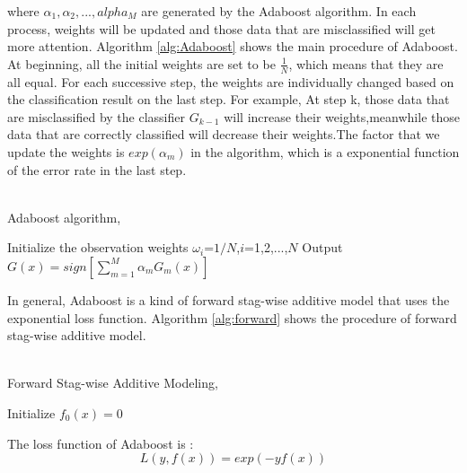 where $\alpha_1,\alpha_2,...,alpha_M$ are generated by the Adaboost algorithm. In each process, weights will be updated and those data that are misclassified will get more attention. Algorithm \ref{alg:Adaboost} shows the main procedure of Adaboost.
At beginning, all the initial weights are set to be $\frac{1}{N}$, which means that they are all equal. For each successive step, the weights are individually changed based on the classification result on the last step. For example, At step k, those data that are misclassified by the classifier $G_{k-1}$ will increase their weights,meanwhile those data that are correctly classified will decrease their weights.The factor that we update the weights is $exp(\alpha_m)$ in the algorithm, which is a exponential function of the error rate in the last step.\\
\\
\begin{algorithm}[H]
	\caption{Adaboost algorithm, \cite{friedman2001elements}}\label{alg:Adaboost}
	\nl Initialize the observation weights $\omega_i$=$1/N$,$i$=1,2,...,$N$\;
	\nl {}
	\nl Output $G(x)=sign[\sum_{m=1}^{M}\alpha_m G_m(x)]$ \;
\end{algorithm}
In general, Adaboost is a kind of forward stag-wise additive model that uses the exponential loss function. Algorithm \ref{alg:forward} shows the procedure of forward stag-wise additive model. \\
\\
\begin{algorithm}[H]
	\caption{Forward Stag-wise Additive Modeling, \cite{friedman2001elements}}\label{alg:forward}\label{alg:forward}
	\nl Initialize $f_0(x)=0$\;
	\nl {}
\end{algorithm}

The loss function of Adaboost is :
\begin{equation}\label{en:loss}
L(y,f(x))=exp(-yf(x))
\end{equation}

